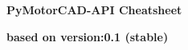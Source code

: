 \documentclass[landscape]{article}
\begin{document}
\raggedright
\footnotesize
\begin{center}
     \Huge{\textbf{PyMotorCAD-API Cheatsheet}} 
\end{center}
\begin{center}
	\small{\textbf{based on version:0.1 (stable)}} 
\end{center}
\vspace{-0.25cm}
\noindent\makebox[\linewidth]{\rule{\paperwidth}{2pt}}
\end{document}
